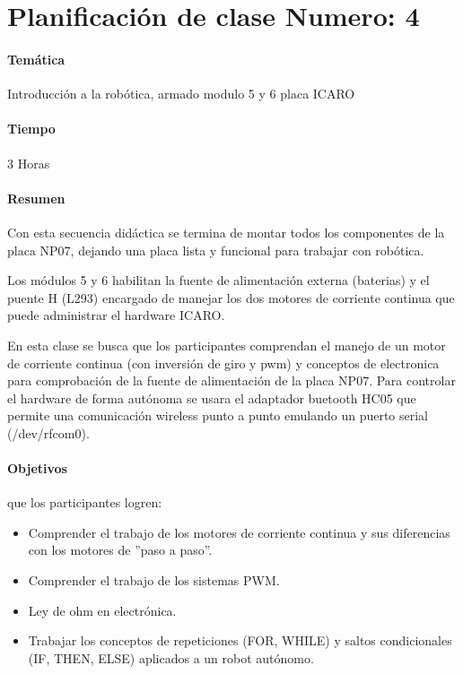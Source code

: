 
\chapter*{Planificación de clase Numero: 4}
\subsubsection{Temática}
Introducción a la robótica, armado modulo 5 y 6 placa ICARO

\subsubsection{Tiempo}
3 Horas

\subsubsection{Resumen}

Con esta secuencia didáctica se termina de montar todos los componentes de la placa NP07, dejando una placa lista y funcional para trabajar con robótica.

Los módulos 5 y 6 habilitan la fuente de alimentación externa (baterias) y el puente H (L293) encargado de manejar los dos motores de corriente continua que puede administrar el hardware ICARO. 

En esta clase se busca que los participantes comprendan el manejo de un motor de corriente continua (con inversión de giro y pwm) y conceptos de electronica para comprobación de la fuente de alimentación de la placa NP07.
Para controlar el hardware de forma autónoma se usara el adaptador buetooth HC05 que permite una comunicación wireless punto a punto emulando un puerto serial (/dev/rfcom0).

\subsubsection{Objetivos}
que los participantes logren:
\begin{itemize}
  \item Comprender el trabajo de los motores de corriente continua y sus diferencias con los motores de ''paso a paso''.
  \item Comprender el trabajo de los sistemas PWM.
  \item Ley de ohm en electrónica.
  \item Trabajar los conceptos de repeticiones (FOR, WHILE) y saltos condicionales (IF, THEN, ELSE) aplicados a un robot autónomo.
\end{itemize}

